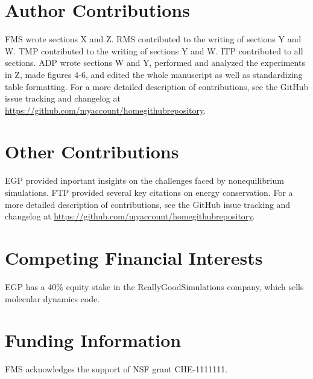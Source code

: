 \documentclass[9pt,bestpractices]{livecoms}
\newcommand{\githubrepository}{\url{https://github.com/myaccount/homegithubrepository}}  %
\begin{document}
\section{Author Contributions}
%
FMS wrote sections X and Z. RMS contributed to the writing of sections
Y and W.  TMP contributed to the writing of sections Y and W. ITP
contributed to all sections.  ADP wrote sections W and Y, performed
and analyzed the experiments in Z, made figures 4-6, and edited the
whole manuscript as well as standardizing table formatting.
For a more detailed description of contributions,
see the GitHub issue tracking and changelog at \githubrepository.

\section{Other Contributions}
%
EGP provided inportant insights on the challenges faced by nonequilibrium simulations.
FTP provided several key citations on energy conservation. For a more detailed description of contributions,
see the GitHub issue tracking and changelog at \githubrepository.

\section{Competing Financial Interests}
EGP has a 40\% equity stake in the ReallyGoodSimulations company, which sells molecular dynamics code.

\section{Funding Information}
FMS acknowledges the support of NSF grant CHE-1111111.
\end{document}
